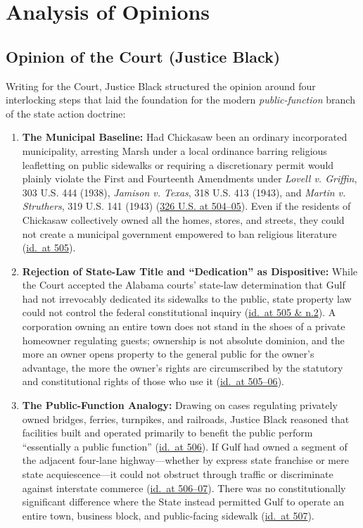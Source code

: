 \documentclass[12pt]{article}
\begin{document}
\section{Analysis of Opinions}
\subsection{Opinion of the Court (Justice Black)}

Writing for the Court, Justice Black structured the opinion around four interlocking steps that laid the foundation for the modern \textit{public-function} branch of the state action doctrine:

\begin{enumerate}
  \item \textbf{The Municipal Baseline:} Had Chickasaw been an ordinary incorporated municipality, arresting Marsh under a local ordinance barring religious leafletting on public sidewalks or requiring a discretionary permit would plainly violate the First and Fourteenth Amendments under \textit{Lovell v. Griffin}, 303 U.S. 444 (1938), \textit{Jamison v. Texas}, 318 U.S. 413 (1943), and \textit{Martin v. Struthers}, 319 U.S. 141 (1943) (\href{https://supreme.justia.com/cases/federal/us/326/501/}{326 U.S. at 504--05}). Even if the residents of Chickasaw collectively owned all the homes, stores, and streets, they could not create a municipal government empowered to ban religious literature (\href{https://supreme.justia.com/cases/federal/us/326/501/}{id.\ at 505}).
  \item \textbf{Rejection of State-Law Title and ``Dedication'' as Dispositive:} While the Court accepted the Alabama courts' state-law determination that Gulf had not irrevocably dedicated its sidewalks to the public, state property law could not control the federal constitutional inquiry (\href{https://supreme.justia.com/cases/federal/us/326/501/}{id.\ at 505 \& n.2}). A corporation owning an entire town does not stand in the shoes of a private homeowner regulating guests; ownership is not absolute dominion, and the more an owner opens property to the general public for the owner's advantage, the more the owner's rights are circumscribed by the statutory and constitutional rights of those who use it (\href{https://supreme.justia.com/cases/federal/us/326/501/}{id.\ at 505--06}).
  \item \textbf{The Public-Function Analogy:} Drawing on cases regulating privately owned bridges, ferries, turnpikes, and railroads, Justice Black reasoned that facilities built and operated primarily to benefit the public perform ``essentially a public function'' (\href{https://supreme.justia.com/cases/federal/us/326/501/}{id.\ at 506}). If Gulf had owned a segment of the adjacent four-lane highway---whether by express state franchise or mere state acquiescence---it could not obstruct through traffic or discriminate against interstate commerce (\href{https://supreme.justia.com/cases/federal/us/326/501/}{id.\ at 506--07}). There was no constitutionally significant difference where the State instead permitted Gulf to operate an entire town, business block, and public-facing sidewalk (\href{https://supreme.justia.com/cases/federal/us/326/501/}{id.\ at 507}).

\end{enumerate}
\end{document}
